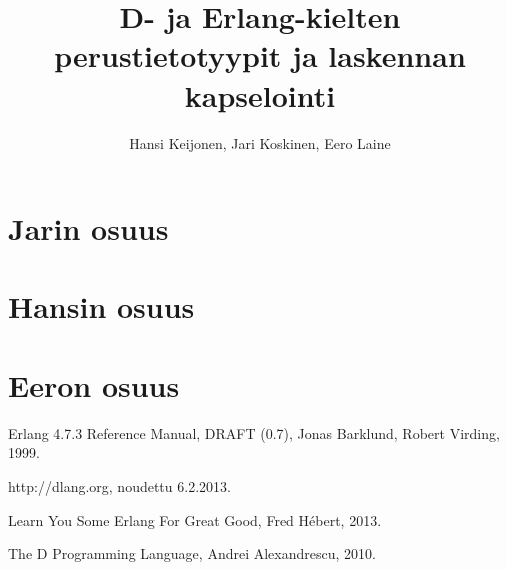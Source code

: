 \documentclass[11pt,oneside,a4paper]{article}
\title{D- ja Erlang-kielten perustietotyypit ja laskennan kapselointi}
\author{Hansi Keijonen, Jari Koskinen, Eero Laine}
\begin{document}
\maketitle

\newpage

\section{Jarin osuus}

\section{Hansin osuus}

\section{Eeron osuus}






\begin{thebibliography}{99}

 Erlang 4.7.3 Reference Manual, DRAFT (0.7), Jonas
Barklund, Robert Virding, 1999. 

 http://dlang.org, noudettu 6.2.2013.

 Learn You Some Erlang For Great Good, Fred Hébert, 2013.

 The D Programming Language, Andrei Alexandrescu, 2010.

\end{thebibliography}
\end{document}
